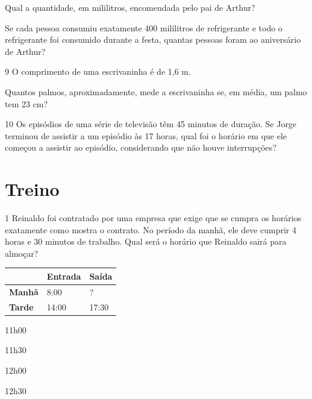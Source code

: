 \begin{escolha}
\item Qual a quantidade, em mililitros, encomendada pelo pai de Arthur?

\item Se cada pessoa consumiu exatamente 400 mililitros de refrigerante e
  todo o refrigerante foi consumido durante a festa, quantas pessoas
  foram ao aniversário de Arthur?
\end{escolha}

\num{9} O comprimento de uma escrivaninha é de 1,6 m. 

\begin{escolha}
\item Quantos palmos,
aproximadamente, mede a escrivaninha se, em média, um palmo tem 23 cm?
\end{escolha}

\num{10} Os episódios de uma série de televisão têm 45 minutos de duração.
Se Jorge terminou de assistir a um episódio às 17 horas, qual foi o
horário em que ele começou a assistir ao episódio, considerando que não houve interrupções?
 
\pagebreak
\section*{Treino}

\num{1} Reinaldo foi contratado por uma empresa que exige que se cumpra os horários exatamente como mostra o contrato. No período da manhã, ele deve
cumprir 4 horas e 30 minutos de trabalho. Qual será o horário que
Reinaldo sairá para almoçar?

\begin{longtable}[]{@{}lll@{}}
\toprule
& \textbf{Entrada} & \textbf{Saída}\tabularnewline
\midrule
\endhead
\hline
\textbf{Manhã} & 8:00 & ?\tabularnewline
\hline
\textbf{Tarde} & 14:00 & 17:30\tabularnewline
\hline
\bottomrule
\end{longtable}

\begin{escolha}
\begin{multicols}{2}

\item 11h00

\item 11h30
\end{multicols}


\begin{multicols}{2}

\item 12h00

\item 12h30
\end{multicols}
\end{escolha}


